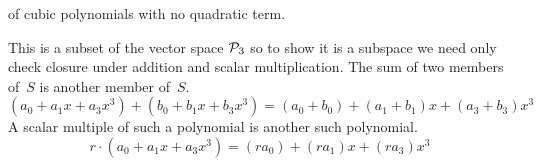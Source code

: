\documentclass[answers]{examjh}
\begin{document}
\begin{questions}
\begin{parts}
      of cubic polynomials with no quadratic term.
    \begin{solution}
      This is a subset of the vector space $\mathcal{P}_3$ so to show it is a 
      subspace we need only
      check closure under addition and scalar multiplication.
      The sum of two members of~$S$ is another member of~$S$.
      \begin{equation*}
        (a_0+a_1x+a_3x^3)
        +(b_0+b_1x+b_3x^3)
        =(a_0+b_0)+(a_1+b_1)x+(a_3+b_3)x^3
      \end{equation*}
      A scalar multiple of such a polynomial is another such polynomial.
      \begin{equation*}
        r\cdot(a_0+a_1x+a_3x^3)
        =(ra_0)+(ra_1)x+(ra_3)x^3
      \end{equation*}
    \end{solution}
\end{parts} 


\end{questions}
\end{document}
